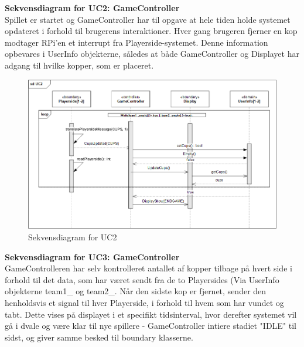 \documentclass[Arkitektur/System_main.tex]{subfiles}
\begin{document}
\textbf{Sekvensdiagram for UC2: GameController}\\
Spillet er startet og GameController har til opgave at hele tiden holde systemet opdateret i forhold til brugerens interaktioner. Hver gang brugeren fjerner en kop modtager RPi'en et interrupt fra Playerside-systemet. Denne information opbevares i UserInfo objekterne, således at både GameController og Displayet har adgang til hvilke kopper, som er placeret. 
\begin{figure}[H]
    \centering
    \includegraphics[width=\textwidth]{Arkitektur/Softwarearkitektur/Applikationsmodel/RPi/graphics_RPi/UC2_SD.png}
    \caption{Sekvensdiagram for UC2}
    \label{fig:UC2_SD_RPi}
\end{figure}

\newpage
\textbf{Sekvensdiagram for UC3: GameController}\\
GameControlleren har selv kontrolleret antallet af kopper tilbage på hvert side i forhold til det data, som har været sendt fra de to Playersides (Via UserInfo objekterne team1\_ og team2\_. Når den sidste kop er fjernet, sender den henholdsvis et signal til hver Playerside, i forhold til hvem som har vundet og tabt. Dette vises på displayet i et specifikt tidsinterval, hvor derefter systemet vil gå i dvale og være klar til nye spillere - GameController intiere stadiet "IDLE" til sidst, og giver samme besked til boundary klasserne. 
\end{document}
